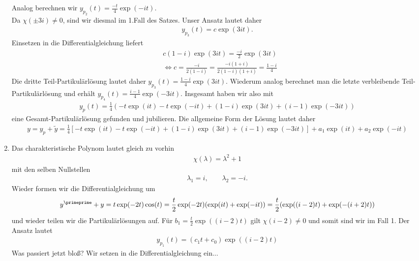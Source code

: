 \begin{solution}
\begin{enumerate}[label = \textbf{\alph*)}]
  Analog berechnen wir $y_{p_2}(t) = \frac{-t}{4}\exp(-it)$. \\
  Da $\chi(\pm 3i) \neq 0$, sind wir diesmal im 1.Fall des Satzes.
  Unser Ansatz lautet daher
  \begin{align*}
    y_{p_3}(t) = c\exp(3it).
  \end{align*}
  Einsetzen in die Differentialgleichung liefert
  \begin{align*}
    &c(1 - i)\exp(3it) = \frac{-i}{2}\exp(3it) \\
    &\iff c = \frac{-i}{2(1-i)} = \frac{-i(1+i)}{2(1-i)(1+i)} = \frac{1-i}{4}
  \end{align*}
  Die dritte Teil-Partikulärlösung lautet daher $y_{p_3}(t) = \frac{1-i}{4}\exp(3it)$.
  Wiederum analog berechnet man die letzte verbleibende Teil-Partikulärlösung
  und erhält $y_{p_4}(t) = \frac{i - 1}{4}\exp(-3it)$.
  Insgesamt haben wir also mit
  \begin{align*}
    y_p(t) = \frac{1}{4}\left(-t\exp(it) - t\exp(-it) + (1-i)\exp(3it) + (i - 1)\exp(-3it)\right)
  \end{align*}
  eine Gesamt-Partikulärlösung gefunden und jubilieren.
  Die allgemeine Form der Lösung lautet daher
  \begin{align*}
    y = y_p + \widetilde{y} = \frac{1}{4}\left[-t\exp(it) - t\exp(-it) + (1-i)\exp(3it) +
    (i - 1)\exp(-3it)\right] + a_1\exp(it) + a_2\exp(-it)
  \end{align*}
  \item Das charakteristische Polynom lautet gleich zu vorhin
  \begin{align*}
    \chi(\lambda) = \lambda^2 + 1
  \end{align*}
  mit den selben Nullstellen
  \begin{align*}
    \lambda_1 = i, \qquad \lambda_2 = -i.
  \end{align*}
  Wieder formen wir die Differentialgleichung um
  \begin{align*}
    y^{\primeprime} + y = t\exp(-2t)\cos(t) = \frac{t}{2}\exp(-2t)(\exp(it) + \exp(-it))
    = \frac{t}{2}(\exp((i-2)t) + \exp(-(i+2)t))
  \end{align*}
  und wieder teilen wir die Partikulärlösungen auf. Für $b_{1} = \frac{t}{2}\exp((i-2)t)$
  gilt $\chi(i - 2) \neq 0$ und somit sind wir im Fall 1. Der Ansatz lautet
  \begin{align*}
    y_{p_1}(t) = (c_1t + c_0)\exp((i-2)t)
  \end{align*}
  Was passiert jetzt bloß? Wir setzen in die Differentialgleichung ein...

\end{enumerate}
\end{solution}
